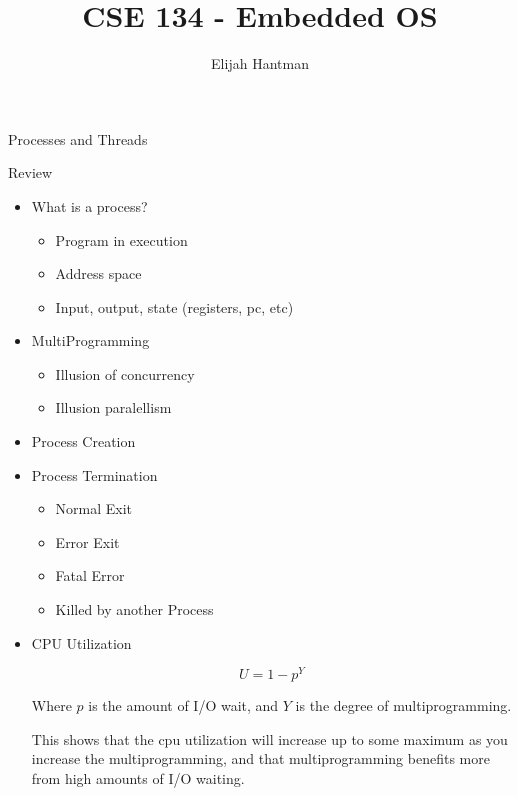 \documentclass{report}
\title{\Huge{CSE 134 - Embedded OS}}
\author{\huge{Elijah Hantman}}
\date{}
\begin{document}
\maketitle
\newpage

\large{Processes and Threads}
\begin{description}
    \item Review 
        \begin{itemize}
            \item What is a process? 
                \begin{itemize}
                    \item Program in execution
                    \item Address space
                    \item Input, output, state (registers, pc, etc)
                \end{itemize}
        \end{itemize}
\end{description}
\begin{itemize}
    \item MultiProgramming
        \begin{itemize}
            \item Illusion of concurrency
            \item Illusion paralellism
        \end{itemize}
    \item Process Creation
    \item Process Termination
        \begin{itemize}
            \item Normal Exit
            \item Error Exit
            \item Fatal Error
            \item Killed by another Process
        \end{itemize}
    \item CPU Utilization
        \begin{mdframed}
            \begin{displaymath}
                U = 1 - p^{Y}
            \end{displaymath}

            Where $p$ is the amount of I/O wait,
            and  $Y$ is the degree of multiprogramming.

            This shows that the cpu utilization will increase
            up to some maximum as you increase the multiprogramming,
            and that multiprogramming benefits more from high amounts
            of I/O waiting.
            
        \end{mdframed}
\end{itemize}
\end{document}
